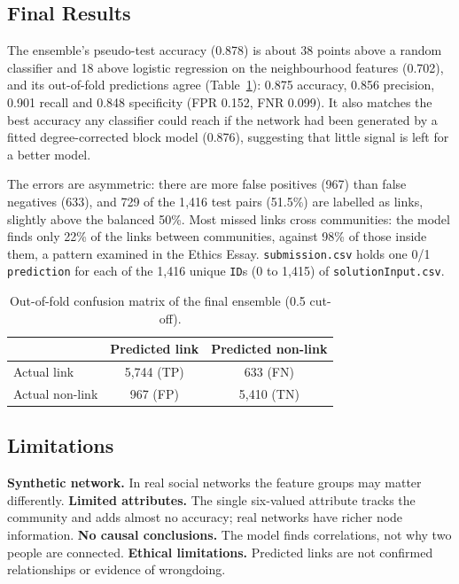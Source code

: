 \documentclass[runningheads]{llncs}
\begin{document}
\subsection{Final Results}
\label{Final Results}

The ensemble's pseudo-test accuracy (0.878) is about 38 points above a random classifier and 18 above logistic regression on the neighbourhood features (0.702), and its out-of-fold predictions agree (Table~\ref{tab:confusion}): 0.875 accuracy, 0.856 precision, 0.901 recall and 0.848 specificity (FPR 0.152, FNR 0.099). It also matches the best accuracy any classifier could reach if the network had been generated by a fitted degree-corrected block model (0.876), suggesting that little signal is left for a better model.

The errors are asymmetric: there are more false positives (967) than false negatives (633), and 729 of the 1{,}416 test pairs (51.5\%) are labelled as links, slightly above the balanced 50\%. Most missed links cross communities: the model finds only 22\% of the links between communities, against 98\% of those inside them, a pattern examined in the Ethics Essay. \texttt{submission.csv} holds one 0/1 \texttt{prediction} for each of the 1{,}416 unique \texttt{ID}s (0 to 1{,}415) of \texttt{solutionInput.csv}.

\begin{table}[ht]
\centering
\small
\caption{Out-of-fold confusion matrix of the final ensemble (0.5 cut-off).}
\label{tab:confusion}
\begin{tabular}{lcc}
\hline
& Predicted link & Predicted non-link \\
\hline
Actual link & 5{,}744 (TP) & 633 (FN) \\
Actual non-link & 967 (FP) & 5{,}410 (TN) \\
\hline
\end{tabular}
\end{table}

\subsection{Limitations}

\noindent\textbf{Synthetic network.} In real social networks the feature groups may matter differently. \textbf{Limited attributes.} The single six-valued attribute tracks the community and adds almost no accuracy; real networks have richer node information. \textbf{No causal conclusions.} The model finds correlations, not why two people are connected. \textbf{Ethical limitations.} Predicted links are not confirmed relationships or evidence of wrongdoing.
\end{document}

